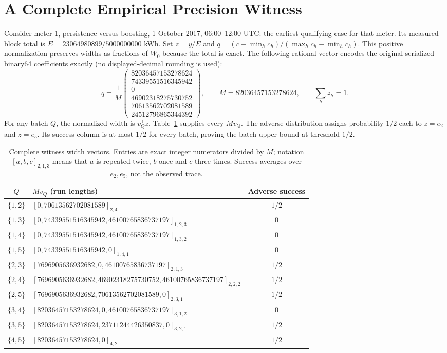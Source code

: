 \section{A Complete Empirical Precision Witness}
\label{app:complete-counter-witness}
Consider meter 1, persistence versus boosting, 1 October 2017, 06:00--12:00
UTC: the earliest qualifying case for that meter. Its measured block total is
$E=23064980899/5000000000$ kWh. Set $z=y/E$ and
$q=(c-\min_hc_h)/(\max_hc_h-\min_hc_h)$. This positive normalization
preserves widths as fractions of $W_0$ because the total is exact. The
following rational vector encodes the original serialized binary64
coefficients exactly (no displayed-decimal rounding is used):
\[
q=\frac1M\begin{pmatrix}
82036457153278624\\74339551516345942\\0\\46902318275730752\\70613562702081589\\24512796865344392
\end{pmatrix},\qquad M=82036457153278624,\qquad \sum_hz_h=1.
\]
For any batch $Q$, the normalized width is $v_Q^\top z$.
Table~\ref{tab:complete-witness-widths} supplies every $Mv_Q$.
The adverse distribution assigns probability $1/2$ each to $z=e_2$ and
$z=e_5$. Its success column is at most $1/2$ for every batch, proving
the batch upper bound at threshold $1/2$.

\begin{table}[htbp]\centering\scriptsize\setlength{\tabcolsep}{3pt}
\caption{Complete witness width vectors. Entries are exact integer
numerators divided by $M$; notation $[a,b,c]_{2,1,3}$ means that $a$
is repeated twice, $b$ once and $c$ three times. Success averages over
$e_2,e_5$, not the observed trace.}\label{tab:complete-witness-widths}
\begin{tabular}{clc}\toprule
$Q$ & $Mv_Q$ (run lengths) & Adverse success\\\midrule
$\{1,2\}$ & $[0,70613562702081589]_{2,4}$ & $1/2$\\
$\{1,3\}$ & $[0,74339551516345942,46100765836737197]_{1,2,3}$ & $0$\\
$\{1,4\}$ & $[0,74339551516345942,46100765836737197]_{1,3,2}$ & $0$\\
$\{1,5\}$ & $[0,74339551516345942,0]_{1,4,1}$ & $0$\\
$\{2,3\}$ & $[7696905636932682,0,46100765836737197]_{2,1,3}$ & $1/2$\\
$\{2,4\}$ & $[7696905636932682,46902318275730752,46100765836737197]_{2,2,2}$ & $1/2$\\
$\{2,5\}$ & $[7696905636932682,70613562702081589,0]_{2,3,1}$ & $1/2$\\
$\{3,4\}$ & $[82036457153278624,0,46100765836737197]_{3,1,2}$ & $0$\\
$\{3,5\}$ & $[82036457153278624,23711244426350837,0]_{3,2,1}$ & $1/2$\\
$\{4,5\}$ & $[82036457153278624,0]_{4,2}$ & $1/2$\\
\bottomrule\end{tabular}\end{table}

